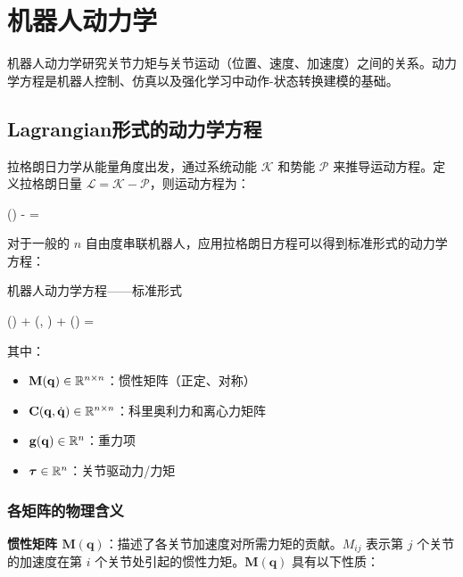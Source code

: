 \section{机器人动力学}

机器人动力学研究关节力矩与关节运动（位置、速度、加速度）之间的关系。动力学方程是机器人控制、仿真以及强化学习中动作-状态转换建模的基础。

\subsection{Lagrangian形式的动力学方程}

拉格朗日力学从能量角度出发，通过系统动能 $\mathcal{K}$ 和势能 $\mathcal{P}$ 来推导运动方程。定义拉格朗日量 $\mathcal{L} = \mathcal{K} - \mathcal{P}$，则运动方程为：

\begin{myformula}
\left(\right) -  = \boldsymbol{\tau}
\end{myformula}

对于一般的 $n$ 自由度串联机器人，应用拉格朗日方程可以得到标准形式的动力学方程：

\begin{mydefinition}{机器人动力学方程——标准形式}
\begin{myformula}
() + (, ) + () = \boldsymbol{\tau}
\end{myformula}
其中：
\begin{itemize}
    \item $\mathbf{M}(\mathbf{q}) \in \mathbb{R}^{n \times n}$：惯性矩阵（正定、对称）
    \item $\mathbf{C}(\mathbf{q}, \dot{\mathbf{q}}) \in \mathbb{R}^{n \times n}$：科里奥利力和离心力矩阵
    \item $\mathbf{g}(\mathbf{q}) \in \mathbb{R}^{n}$：重力项
    \item $\boldsymbol{\tau} \in \mathbb{R}^{n}$：关节驱动力/力矩
\end{itemize}
\end{mydefinition}

\subsubsection{各矩阵的物理含义}

\textbf{惯性矩阵 $\mathbf{M}(\mathbf{q})$}：描述了各关节加速度对所需力矩的贡献。$M_{ij}$ 表示第 $j$ 个关节的加速度在第 $i$ 个关节处引起的惯性力矩。$\mathbf{M}(\mathbf{q})$ 具有以下性质：

